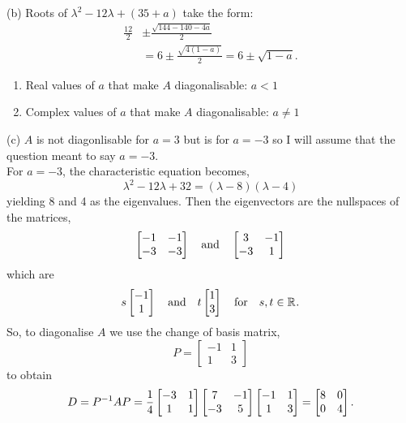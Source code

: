 \documentclass[../MathsNotesBase.tex]{subfiles}
\begin{document}
	\pagebreak
	(b) Roots of ${ \lambda^2 - 12\lambda + (35 + a) }$ take the form:
	\[\begin{aligned}
		\frac{12}{2} &\pm \frac{\sqrt{144 - 140 - 4a}}{2} \\
		&= 6 \pm \frac{\sqrt{4(1 - a)}}{2} = 6 \pm \sqrt{1 - a}.
	\end{aligned}\]
	\begin{enumerate}[label=(\roman*)]
		\item Real values of $a$ that make $A$ diagonalisable: ${ a < 1}$
		\item Complex values of $a$ that make $A$ diagonalisable: ${ a \neq 1 }$
	\end{enumerate}

	\nl[6]
	(c) $A$ is not diagonlisable for $a = 3$ but is for ${ a = -3 }$ so I will assume that the question meant to say ${ a = -3 }$.\\
	
	For ${ a = -3 }$, the characteristic equation becomes,
	\[ \lambda^2 - 12 \lambda + 32 = (\lambda - 8)(\lambda - 4) \]
	yielding 8 and 4 as the eigenvalues. Then the eigenvectors are the nullspaces of the matrices,
	\[
		 \begin{bmatrix}
		 	-1 & -1\\
		 	-3 & -3
		 \end{bmatrix} \hspace{10pt}\text{and}\hspace{10pt}
	 	 \begin{bmatrix}
	 	 	3 & -1\\
	 	 	-3 & 1
	 	 \end{bmatrix}
	\]
	which are
	\[ s \begin{bmatrix}-1\\1\end{bmatrix} \hspace{10pt}\text{and}\hspace{10pt} t \begin{bmatrix}1\\3\end{bmatrix} \hspace{10pt}\text{for}\hspace{10pt} s,t \in \mathbb{R}^{}. \]
	So, to diagonalise $A$ we use the change of basis matrix,
	\[ P = 	\begin{bmatrix}
				-1 & 1\\
				1 & 3
			\end{bmatrix}
	\]
	to obtain
	\[ D = {P}^{-1}AP = 	\frac{1}{4}
						\begin{bmatrix}
							-3 & 1\\
							1 & 1
						\end{bmatrix}
						\begin{bmatrix}
							7 & -1\\
							-3 & 5
						\end{bmatrix}
						\begin{bmatrix}
							-1 & 1\\
							1 & 3
						\end{bmatrix} =
						\begin{bmatrix}
							8 & 0\\
							0 & 4
						\end{bmatrix}.
	\]
	 
\end{document}
